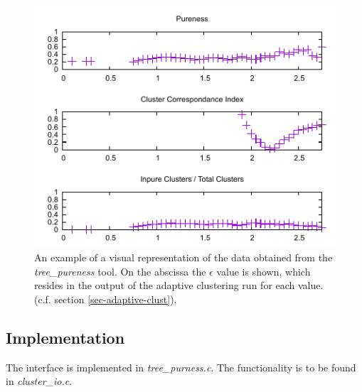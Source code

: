 \begin{figure}
  \begin{center}
    \includegraphics[scale=1.4]{pureness-example.pdf}
    \caption{An example of a visual representation of the data
      obtained from the \emph{tree\_pureness} tool. On the abscissa
      the $\epsilon$ value is shown, which resides in the output of
      the adaptive clustering run for each
      value. (c.f. section \ref{sec-adaptive-clust}).}
    \label{fig-pureness-example}
  \end{center}
\end{figure}

\subsection{Implementation}
The interface is implemented in \emph{tree\_purness.c}. The
functionality is to be found in \emph{cluster\_io.c}. 

